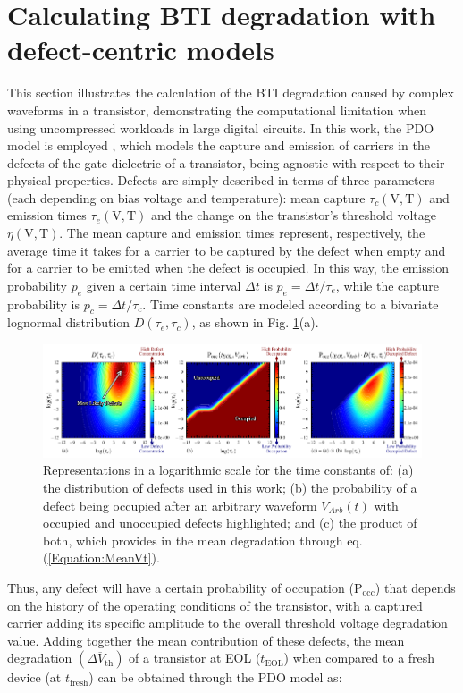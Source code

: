 \section{Calculating BTI degradation with defect-centric models}
\label{section:ModelingBTI}
This section illustrates the calculation of the \gls{BTI} degradation caused by complex waveforms in a transistor, demonstrating the computational limitation when using uncompressed workloads in large digital circuits. In this work, the PDO model is employed \cite{martin-martinezProbabilisticDefectOccupancy2011}, which models the capture and emission of carriers in the defects of the gate dielectric of a transistor, being agnostic with respect to their physical properties. Defects are simply described in terms of three parameters (each depending on bias voltage and temperature): mean capture $\tau_c (\text{V},\text{T})$ and emission times $\tau_e (\text{V},\text{T})$ and the change on the transistor's threshold voltage $\eta (\text{V},\text{T})$. The mean capture and emission times represent, respectively, the average time it takes for a carrier to be captured by the defect when empty and for a carrier to be emitted when the defect is occupied. In this way, the emission probability $p_e$ given a certain time interval $\Delta t$ is $p_e=\Delta t / \tau_e$, while the capture probability is $p_c=\Delta t / \tau_c$. Time constants are modeled according to a bivariate lognormal distribution $D\left(\tau_e, \tau_c\right)$, as shown in Fig. \ref{fig:PDO_Intro}(a).
\begin{figure}[!t]
    \includegraphics[width=\textwidth,trim={0 0.5mm 0 0mm},clip]{images/ch2/plot_pocc_ddefect_together.pdf}
    \caption{Representations in a logarithmic scale for the time constants of: (a) the distribution of defects used in this work; (b) the probability of a defect being occupied after an arbitrary waveform $V_{Arb}(t)$ with occupied and unoccupied defects highlighted; and (c) the product of both, which provides in the mean degradation through eq. (\ref{Equation:MeanVt}).}
    \label{fig:PDO_Intro}
\end{figure}
Thus, any defect will have a certain probability of occupation ($\text{P}_{\text{occ}}$) that depends on the history of the operating conditions of the transistor, with a captured carrier adding its specific amplitude to the overall threshold voltage degradation value. Adding together the mean contribution of these defects, the mean degradation $(\overline{\Delta V_\text{th}})$ of a transistor at EOL ($t_\text{EOL}$) when compared to a fresh device (at $t_\text{fresh}$) can be obtained through the PDO model as:
